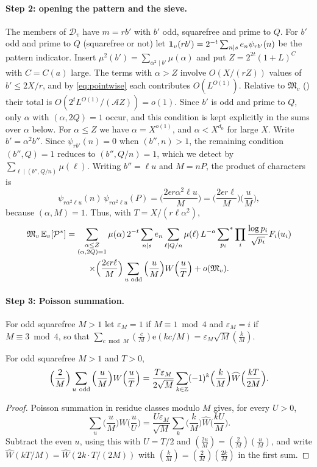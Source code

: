 \documentclass[11pt,colorlinks]{charlie}
\newcommand{\cD}{\mathcal{D}}
\newcommand{\cA}{\mathcal{A}}
\newcommand{\e}{\mathrm{e}}
\begin{document}
\paragraph{Step 2: opening the pattern and the sieve.}
The members of $\cD_v$ have $m=rb'$ with $b'$ odd, squarefree and prime to $Q$. For $b'$ odd and prime to $Q$ (squarefree or not) let $\mathbf{1}_v(rb')=2^{-t}\sum_{n\mid s}e_n\psi_{rb'}(n)$ be the pattern indicator. Insert $\mu^2(b')=\sum_{\alpha^2\mid b'}\mu(\alpha)$ and put $Z=2^{2t}(1+L)^C$ with $C=C(a)$ large. The terms with $\alpha>Z$ involve $O(X/(rZ))$ values of $b'\le2X/r$, and by \eqref{eq:pointwise} each contributes $O(L^{O(1)})$. Relative to $\mathfrak M_v$ () their total is $O(2^tL^{O(1)}/(\cA Z))=o(1)$. Since $b'$ is odd and prime to $Q$, only $\alpha$ with $(\alpha,2Q)=1$ occur, and this condition is kept explicitly in the sums over $\alpha$ below. For $\alpha\le Z$ we have $\alpha=X^{o(1)}$, and $\alpha<X^{d_0}$ for large $X$. Write $b'=\alpha^2b''$. Since $\psi_{rb'}(n)=0$ when $(b'',n)>1$, the remaining condition $(b'',Q)=1$ reduces to $(b'',Q/n)=1$, which we detect by $\sum_{\ell\mid(b'',Q/n)}\mu(\ell)$. Writing $b''=\ell u$ and $M=nP$, the product of characters is
\[
 \psi_{r\alpha^2\ell u}(n)\,\psi_{r\alpha^2\ell u}(P)=\Big(\frac{2\epsilon r\alpha^2\ell u}{M}\Big)=\Big(\frac{2\epsilon r\ell}M\Big)\Big(\frac uM\Big),
\]
because $(\alpha,M)=1$. Thus, with $T=X/(r\ell\alpha^2)$,
\begin{multline}\label{eq:opened}
 \mathfrak M_v\,\mathbb{E}_v[\mathcal P^*]=\sum_{\substack{\alpha\le Z\\(\alpha,2Q)=1}}\mu(\alpha)\,2^{-t}\sum_{n\mid s}e_n\sum_{\ell\mid Q/n}\mu(\ell)\,L^{-a}\sideset{}{^*}\sum_{p_i}\prod_i\frac{\log p_i}{\sqrt{p_i}}F_i(u_i)\\
 \times\Big(\frac{2\epsilon r\ell}M\Big)\sum_{u\text{ odd}}\Big(\frac uM\Big)W\Big(\frac uT\Big)+o(\mathfrak M_v).
\end{multline}

\paragraph{Step 3: Poisson summation.}
For odd squarefree $M>1$ let $\varepsilon_M=1$ if $M\equiv1\bmod4$ and $\varepsilon_M=i$ if $M\equiv3\bmod4$, so that $\sum_{c\bmod M}(\tfrac cM)\e(kc/M)=\varepsilon_M\sqrt M(\tfrac kM)$.

\begin{lemma}\label{lem:oddlattice}
For odd squarefree $M>1$ and $T>0$,
\[
 \Big(\frac2M\Big)\sum_{u\ \mathrm{odd}}\Big(\frac uM\Big)W\Big(\frac uT\Big)=\frac{T\varepsilon_M}{2\sqrt M}\sum_{k\in\Z}(-1)^k\Big(\frac kM\Big)\widehat W\Big(\frac{kT}{2M}\Big).
\]
\end{lemma}
\begin{proof}
Poisson summation in residue classes modulo $M$ gives, for every $U>0$,
\[
 \sum_u\Big(\frac uM\Big)W\Big(\frac uU\Big)=\frac{U\varepsilon_M}{\sqrt M}\sum_k\Big(\frac kM\Big)\widehat W\Big(\frac{kU}M\Big).
\]
Subtract the even $u$, using this with $U=T/2$ and $(\tfrac{2u}M)=(\tfrac2M)(\tfrac uM)$, and write $\widehat W(kT/M)=\widehat W(2k\cdot T/(2M))$ with $(\tfrac kM)=(\tfrac2M)(\tfrac{2k}M)$ in the first sum.
\end{proof}
\end{document}
